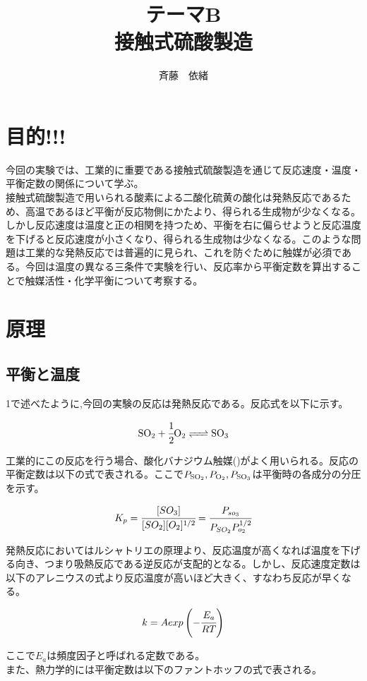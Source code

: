 \documentclass{ltjsarticle}
\title{テーマB\\接触式硫酸製造}
\author{斉藤　依緒}
\begin{document}
\section{目的!!!}
今回の実験では、工業的に重要である接触式硫酸製造を通じて反応速度・温度・平衡定数の関係について学ぶ。\\
接触式硫酸製造で用いられる酸素による二酸化硫黄の酸化は発熱反応であるため、高温であるほど平衡が反応物側にかたより、得られる生成物が少なくなる。しかし反応速度は温度と正の相関を持つため、平衡を右に偏らせようと反応温度を下げると反応速度が小さくなり、得られる生成物は少なくなる。このような問題は工業的な発熱反応では普遍的に見られ、これを防ぐために触媒が必須である。今回は温度の異なる三条件で実験を行い、反応率から平衡定数を算出することで触媒活性・化学平衡について考察する。

\section{原理}

\subsection{平衡と温度}
1で述べたように,今回の実験の反応は発熱反応である。反応式を以下に示す。

\begin{equation}
    \ce{SO2 + $\cfrac{1}{2}$O2 <=> SO3 }
\end{equation}

工業的にこの反応を行う場合、酸化バナジウム触媒()がよく用いられる。反応の平衡定数は以下の式で表される。ここで$P_{\ce{SO2}},P_{\ce{O2}},P_{\ce{SO3}}$は平衡時の各成分の分圧を示す。

\begin{equation}
    K_p=\cfrac{[SO_3]}{[SO_2][O_2]^{1/2}}=\cfrac{P_{so_3}}{P_{SO_2}P_{o_2}^{1/2}}
\end{equation}

発熱反応においてはルシャトリエの原理より、反応温度が高くなれば温度を下げる向き、つまり吸熱反応である逆反応が支配的となる。しかし、反応速度定数は以下のアレニウスの式より反応温度が高いほど大きく、すなわち反応が早くなる。

\begin{equation}
    k=Aexp\left(-\cfrac{E_a}{RT}\right)
\end{equation}

ここで$E_a$は頻度因子と呼ばれる定数である。\\
また、熱力学的には平衡定数は以下のファントホッフの式で表される。
\end{document}
